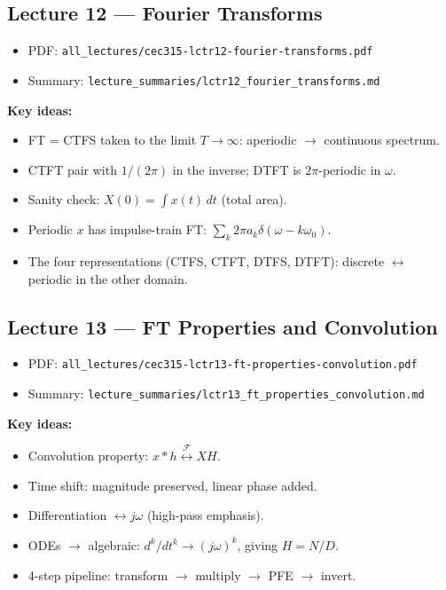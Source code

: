 \documentclass[11pt]{article}
\newcommand{\FT}{\overset{\mathcal{F}}{\longleftrightarrow}}
\begin{document}
\subsection{Lecture 12 --- Fourier Transforms}
\begin{itemize}[leftmargin=*]
  \item PDF: \texttt{all\_lectures/cec315-lctr12-fourier-transforms.pdf}
  \item Summary: \texttt{lecture\_summaries/lctr12\_fourier\_transforms.md}
\end{itemize}
\textbf{Key ideas:}
\begin{itemize}[leftmargin=*]
  \item FT = CTFS taken to the limit $T\to\infty$: aperiodic $\to$ continuous spectrum.
  \item CTFT pair with $1/(2\pi)$ in the inverse; DTFT is $2\pi$-periodic in $\omega$.
  \item Sanity check: $X(0)=\int x(t)\,dt$ (total area).
  \item Periodic $x$ has impulse-train FT: $\sum_k 2\pi a_k\delta(\omega-k\omega_0)$.
  \item The four representations (CTFS, CTFT, DTFS, DTFT): discrete $\leftrightarrow$ periodic in the other domain.
\end{itemize}

\subsection{Lecture 13 --- FT Properties and Convolution}
\begin{itemize}[leftmargin=*]
  \item PDF: \texttt{all\_lectures/cec315-lctr13-ft-properties-convolution.pdf}
  \item Summary: \texttt{lecture\_summaries/lctr13\_ft\_properties\_convolution.md}
\end{itemize}
\textbf{Key ideas:}
\begin{itemize}[leftmargin=*]
  \item Convolution property: $x*h \FT XH$.
  \item Time shift: magnitude preserved, linear phase added.
  \item Differentiation $\leftrightarrow j\omega$ (high-pass emphasis).
  \item ODEs $\to$ algebraic: $d^k/dt^k \to (j\omega)^k$, giving $H = N/D$.
  \item 4-step pipeline: transform $\to$ multiply $\to$ PFE $\to$ invert.
\end{itemize}
\end{document}
